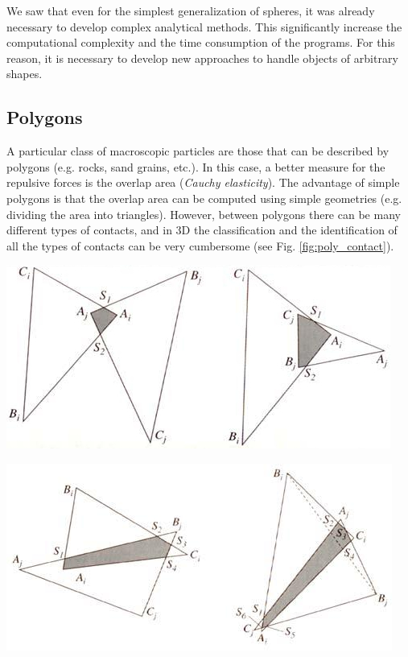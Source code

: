 We saw that even for the simplest generalization of spheres, it was already necessary to develop complex analytical methods. This significantly increase the computational complexity and the time consumption of the programs. For this reason, it is necessary to develop new approaches to handle objects of arbitrary shapes.



\subsection{Polygons}


A particular class of macroscopic particles are those that can be described by polygons (e.g. rocks, sand grains, etc.).  In this case, a better measure for the repulsive forces is the overlap area (\emph{Cauchy elasticity}). The advantage of simple polygons is that the overlap area can be computed using simple geometries (e.g. dividing the area into triangles). However, between polygons there can be many different types of contacts, and in 3D the classification and the identification of all the types of contacts can be very cumbersome (see Fig. \ref{fig:poly_contact}).



\vspace{0.1cm}
\noindent
\begin{minipage}{\textwidth}
\begin{minipage}{.85\textwidth}
  \centering
  \includegraphics[width=.75\textwidth]{pics/poly_contact.jpeg}
\end{minipage}
\begin{minipage}{.85\textwidth}
  \centering
  \includegraphics[width=.75\textwidth]{pics/poly_contact2.jpeg}
  \label{fig:poly_contact}
\end{minipage}
\end{minipage}
\vspace{0.1cm}







